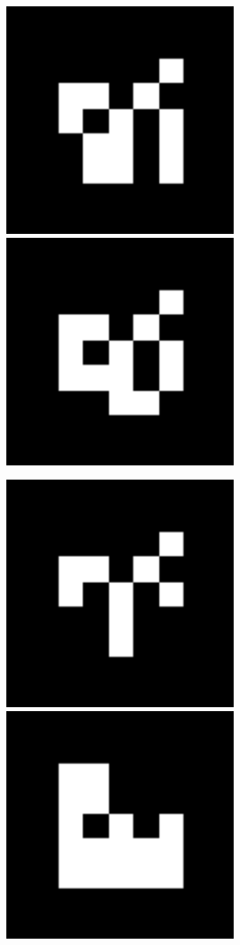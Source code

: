 \documentclass[10pt,letterpaper]{article}
\begin{document}
\includegraphics[width=3in]{MarkerData_141.png}
\includegraphics[width=3in]{MarkerData_142.png}


\includegraphics[width=3in]{MarkerData_143.png}
\includegraphics[width=3in]{MarkerData_144.png}
\end{document}
